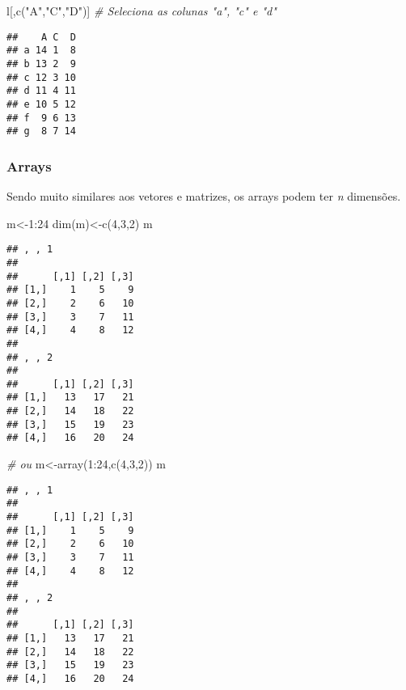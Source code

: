 \documentclass[
]{book}
\newenvironment{Shaded}{\begin{snugshade}}{\end{snugshade}}
\newcommand{\CommentTok}[1]{\textcolor[rgb]{0.56,0.35,0.01}{\textit{#1}}}
\newcommand{\DecValTok}[1]{\textcolor[rgb]{0.00,0.00,0.81}{#1}}
\newcommand{\FunctionTok}[1]{\textcolor[rgb]{0.00,0.00,0.00}{#1}}
\newcommand{\NormalTok}[1]{#1}
\newcommand{\OtherTok}[1]{\textcolor[rgb]{0.56,0.35,0.01}{#1}}
\newcommand{\SpecialCharTok}[1]{\textcolor[rgb]{0.00,0.00,0.00}{#1}}
\newcommand{\StringTok}[1]{\textcolor[rgb]{0.31,0.60,0.02}{#1}}
\begin{document}
\begin{Shaded}
\begin{Highlighting}[]
\NormalTok{l[,}\FunctionTok{c}\NormalTok{(}\StringTok{"A"}\NormalTok{,}\StringTok{"C"}\NormalTok{,}\StringTok{"D"}\NormalTok{)] }\CommentTok{\# Seleciona as colunas "a", "c" e "d"}
\end{Highlighting}
\end{Shaded}

\begin{verbatim}
##    A C  D
## a 14 1  8
## b 13 2  9
## c 12 3 10
## d 11 4 11
## e 10 5 12
## f  9 6 13
## g  8 7 14
\end{verbatim}

\hypertarget{arrays}{%
\subsubsection{Arrays}\label{arrays}}

Sendo muito similares aos vetores e matrizes, os arrays podem ter \emph{n} dimensões.

\begin{Shaded}
\begin{Highlighting}[]
\NormalTok{m}\OtherTok{\textless{}{-}}\DecValTok{1}\SpecialCharTok{:}\DecValTok{24}
\FunctionTok{dim}\NormalTok{(m)}\OtherTok{\textless{}{-}}\FunctionTok{c}\NormalTok{(}\DecValTok{4}\NormalTok{,}\DecValTok{3}\NormalTok{,}\DecValTok{2}\NormalTok{)}
\NormalTok{m}
\end{Highlighting}
\end{Shaded}

\begin{verbatim}
## , , 1
## 
##      [,1] [,2] [,3]
## [1,]    1    5    9
## [2,]    2    6   10
## [3,]    3    7   11
## [4,]    4    8   12
## 
## , , 2
## 
##      [,1] [,2] [,3]
## [1,]   13   17   21
## [2,]   14   18   22
## [3,]   15   19   23
## [4,]   16   20   24
\end{verbatim}

\begin{Shaded}
\begin{Highlighting}[]
\CommentTok{\# ou}
\NormalTok{m}\OtherTok{\textless{}{-}}\FunctionTok{array}\NormalTok{(}\DecValTok{1}\SpecialCharTok{:}\DecValTok{24}\NormalTok{,}\FunctionTok{c}\NormalTok{(}\DecValTok{4}\NormalTok{,}\DecValTok{3}\NormalTok{,}\DecValTok{2}\NormalTok{))}
\NormalTok{m}
\end{Highlighting}
\end{Shaded}

\begin{verbatim}
## , , 1
## 
##      [,1] [,2] [,3]
## [1,]    1    5    9
## [2,]    2    6   10
## [3,]    3    7   11
## [4,]    4    8   12
## 
## , , 2
## 
##      [,1] [,2] [,3]
## [1,]   13   17   21
## [2,]   14   18   22
## [3,]   15   19   23
## [4,]   16   20   24
\end{verbatim}
\end{document}
